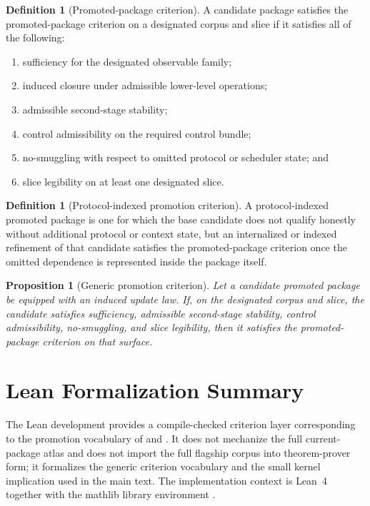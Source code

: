 \documentclass[11pt]{article}
\newtheorem{proposition}[theorem]{Proposition}
\theoremstyle{definition}
\newtheorem{definition}[theorem]{Definition}
\begin{document}
\begin{definition}[Promoted-package criterion]
A candidate package satisfies the promoted-package criterion on a designated corpus and slice if it satisfies all of the following:
\begin{enumerate}[label=(\roman*)]
\item sufficiency for the designated observable family;
\item induced closure under admissible lower-level operations;
\item admissible second-stage stability;
\item control admissibility on the required control bundle;
\item no-smuggling with respect to omitted protocol or scheduler state; and
\item slice legibility on at least one designated slice.
\end{enumerate}
\end{definition}

\begin{definition}[Protocol-indexed promotion criterion]
A protocol-indexed promoted package is one for which the base candidate does not qualify honestly without additional protocol or context state, but an internalized or indexed refinement of that candidate satisfies the promoted-package criterion once the omitted dependence is represented inside the package itself.
\end{definition}

\begin{proposition}[Generic promotion criterion]
Let a candidate promoted package be equipped with an induced update law. If, on the designated corpus and slice, the candidate satisfies sufficiency, admissible second-stage stability, control admissibility, no-smuggling, and slice legibility, then it satisfies the promoted-package criterion on that surface.
\end{proposition}
 \section{Lean Formalization Summary}\label{app:lean}

The Lean development provides a compile-checked criterion layer corresponding to the promotion vocabulary of  and . It does not mechanize the full current-package atlas and does not import the full flagship corpus into theorem-prover form; it formalizes the generic criterion vocabulary and the small kernel implication used in the main text. The implementation context is Lean~4 together with the mathlib library environment \citep{deMouraUllrich2021,Mathlib2020}.
\end{document}

